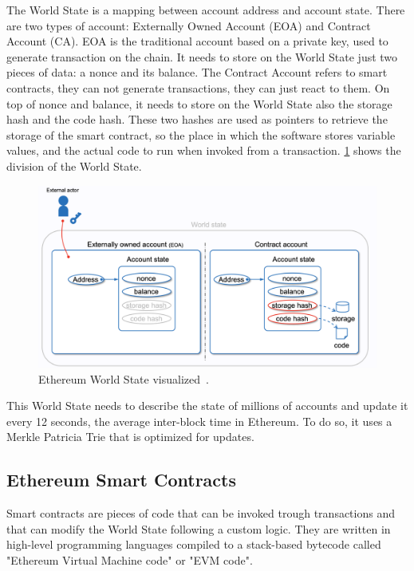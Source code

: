 The World State is a mapping between account address and account state. There are two types of account: Externally Owned Account (EOA) and Contract Account (CA). EOA is the traditional account based on a private key, used to generate transaction on the chain. It needs to store on the World State just two pieces of data: a nonce and its balance. The Contract Account refers to smart contracts, they can not generate transactions, they can just react to them. On top of nonce and balance, it needs to store on the World State also the storage hash and the code hash. These two hashes are used as pointers to retrieve the storage of the smart contract, so the place in which the software stores variable values, and the actual code to run when invoked from a transaction. \cref{fig:ethereum-world-state} shows the division of the World State.

\begin{figure}[H]
    \centering
    \includegraphics[width=1\textwidth]{Figures/background/world-state.png}
    \caption{Ethereum World State visualized~\cite{evm-illustrated}.}
    \label{fig:ethereum-world-state}
\end{figure}

This World State needs to describe the state of millions of accounts and update it every 12 seconds, the average inter-block time in Ethereum. To do so, it uses a Merkle Patricia Trie that is optimized for updates. 

\subsection{Ethereum Smart Contracts}

Smart contracts are pieces of code that can be invoked trough transactions and that can modify the World State following a custom logic. They are written in high-level programming languages compiled to a stack-based bytecode called "Ethereum Virtual Machine code" or "EVM code". 

